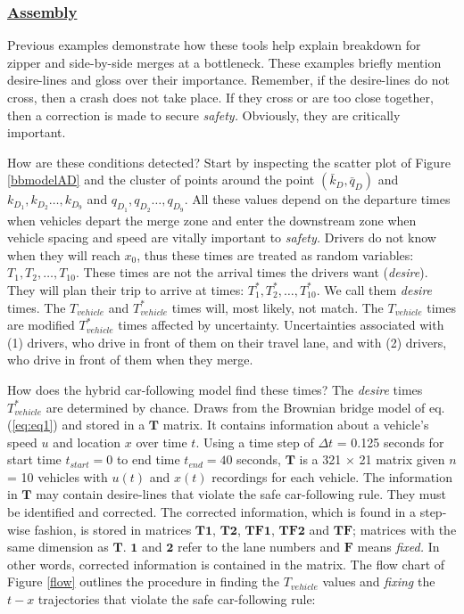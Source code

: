 \documentclass[Proceedings]{ascelike}
\begin{document}
\subsubsection{\underline{Assembly}}


Previous examples demonstrate how these tools help explain breakdown for zipper and side-by-side merges at a bottleneck. These examples briefly mention desire-lines and gloss over their importance. Remember, if the desire-lines do not cross, then a crash does not take place. If they cross or are too close together, then a correction is made to secure \emph{safety.} Obviously, they are critically important.

How are these conditions detected? Start by inspecting the scatter plot of Figure \ref{bbmodelAD} and the cluster of points around the point $(\bar{k}_D, \bar{q}_D)$ and $k_{D_1},k_{D_2} \ldots,k_{D_9}$ and $q_{D_1},q_{D_2} \ldots,q_{D_9}$. All these values depend on the departure times when vehicles depart the merge zone and enter the downstream zone when vehicle spacing and speed are vitally important to \emph{safety.} Drivers do not know when they will reach $x_0$, thus these times are treated as random variables: $T_1, T_2,\ldots,T_{10}$. These times are not the arrival  times the drivers want (\emph{desire}).  They will plan their trip to arrive at times: $T^*_1, T^*_2,\ldots,T^*_{10}$. We call them \emph{desire} times. The  $T_{vehicle}$ and $T_{vehicle}^*$ times will, most likely, not match.  The  $T_{vehicle}$  times are modified   $T_{vehicle}^*$ times affected by uncertainty. Uncertainties associated with (1) drivers,  who drive in front of them on their travel lane, and with (2) drivers, who drive in front of them when they merge.

How does the hybrid car-following model find these times? The  \emph{desire}  times  $T_{vehicle}^*$ are determined by chance. Draws from the Brownian bridge model of eq.(\ref{eq:eq1}) and stored in a $\mathbf{T}$ matrix. It contains information about a vehicle's speed $u$ and location $x$ over time $t$. Using a time step of $\Delta t$ = 0.125 seconds for start time $t_{start} = 0$ to end time $t_{end} = 40$ seconds, $\mathbf{T}$  is a  321 $\times$ 21 matrix given $n$ = 10 vehicles with  $u(t)$ and $x(t)$ recordings for each vehicle.  The information in $\mathbf{T}$ may contain desire-lines that violate the safe car-following rule. They must be identified and corrected. The corrected information, which is found in a step-wise fashion,  is stored in matrices $\mathbf{T1}$, $\mathbf{T2}$, $\mathbf{TF1}$, $\mathbf{TF2}$ and $\mathbf{TF}$; matrices with the same dimension as $\mathbf{T}$. $\mathbf{1}$ and $\mathbf{2}$ refer to the lane numbers and $\mathbf{F}$ means \emph{fixed.}  In other words, corrected information is contained in the matrix.  The flow chart of Figure \ref{flow} outlines the procedure in finding the  $T_{vehicle}$ values and \emph{fixing} the $t-x$ trajectories that violate the safe car-following rule:
\end{document}
